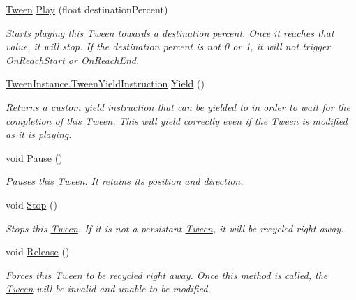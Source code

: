 \begin{DoxyCompactItemize}
\mbox{\hyperlink{struct_leap_1_1_unity_1_1_animation_1_1_tween}{Tween}} \mbox{\hyperlink{struct_leap_1_1_unity_1_1_animation_1_1_tween_a8453ef9311e720d1518b1a6bd9466ff9}{Play}} (float destination\+Percent)
\begin{DoxyCompactList}\small\item\em Starts playing this \mbox{\hyperlink{struct_leap_1_1_unity_1_1_animation_1_1_tween}{Tween}} towards a destination percent. Once it reaches that value, it will stop. If the destination percent is not 0 or 1, it will not trigger On\+Reach\+Start or On\+Reach\+End. \end{DoxyCompactList}\item 
\mbox{\hyperlink{struct_leap_1_1_unity_1_1_animation_1_1_internal_1_1_tween_instance_1_1_tween_yield_instruction}{Tween\+Instance.\+Tween\+Yield\+Instruction}} \mbox{\hyperlink{struct_leap_1_1_unity_1_1_animation_1_1_tween_ae3aea546f6195b60ace0fd614c3925d4}{Yield}} ()
\begin{DoxyCompactList}\small\item\em Returns a custom yield instruction that can be yielded to in order to wait for the completion of this \mbox{\hyperlink{struct_leap_1_1_unity_1_1_animation_1_1_tween}{Tween}}. This will yield correctly even if the \mbox{\hyperlink{struct_leap_1_1_unity_1_1_animation_1_1_tween}{Tween}} is modified as it is playing. \end{DoxyCompactList}\item 
void \mbox{\hyperlink{struct_leap_1_1_unity_1_1_animation_1_1_tween_a081bc17380d04763af8322c31b1ab887}{Pause}} ()
\begin{DoxyCompactList}\small\item\em Pauses this \mbox{\hyperlink{struct_leap_1_1_unity_1_1_animation_1_1_tween}{Tween}}. It retains its position and direction. \end{DoxyCompactList}\item 
void \mbox{\hyperlink{struct_leap_1_1_unity_1_1_animation_1_1_tween_ad5f8092aec0bf5f7f301b9dbeef5a666}{Stop}} ()
\begin{DoxyCompactList}\small\item\em Stops this \mbox{\hyperlink{struct_leap_1_1_unity_1_1_animation_1_1_tween}{Tween}}. If it is not a persistant \mbox{\hyperlink{struct_leap_1_1_unity_1_1_animation_1_1_tween}{Tween}}, it will be recycled right away. \end{DoxyCompactList}\item 
void \mbox{\hyperlink{struct_leap_1_1_unity_1_1_animation_1_1_tween_aae3c96c326e36d7dd2079ec15f772409}{Release}} ()
\begin{DoxyCompactList}\small\item\em Forces this \mbox{\hyperlink{struct_leap_1_1_unity_1_1_animation_1_1_tween}{Tween}} to be recycled right away. Once this method is called, the \mbox{\hyperlink{struct_leap_1_1_unity_1_1_animation_1_1_tween}{Tween}} will be invalid and unable to be modified. \end{DoxyCompactList}\end{DoxyCompactItemize}
